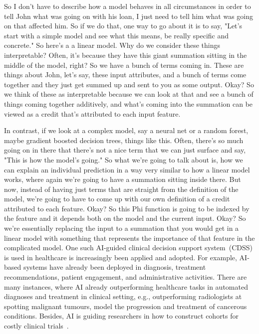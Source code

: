 \hspace*{3.5mm} So I don't have to describe how a model behaves in all circumstances in order to tell John what was going on with his loan, I just need to tell him what was going on that affected him. So if we do that, one way to go about it is to say, "Let's start with a simple model and see what this means, be really specific and concrete." So here's a a linear model. Why do we consider these things interpretable? Often, it's because they have this giant summation sitting in the middle of the model, right? So we have a bunch of terms coming in. These are things about John, let's say, these input attributes, and a bunch of terms come together and they just get summed up and sent to you as some output. Okay? So we think of these as interpretable because we can look at that and see a bunch of things coming together additively, and what's coming into the summation can be viewed as a credit that's attributed to each input feature. 

\hspace*{3.5mm} In contrast, if we look at a complex model, say a neural net or a random forest, maybe gradient boosted decision trees, things like this. Often, there's so much going on in there that there's not a nice term that we can just surface and say, "This is how the model's going." So what we're going to talk about is, how we can explain an individual prediction in a way very similar to how a linear model works, where again we're going to have a summation sitting inside there. But now, instead of having just terms that are straight from the definition of the model, we're going to have to come up with our own definition of a credit attributed to each feature. Okay? So this Phi function is going to be indexed by the feature and it depends both on the model and the current input. Okay? So we're essentially replacing the input to a summation that you would get in a linear model with something that represents the importance of that feature in the complicated model. One such AI-guided clinical decision support system~(CDSS) is used in healthcare is increasingly been applied and adopted. For example, AI-based systems have already been deployed in diagnosis, treatment recommendations, patient engagement, and administrative activities. There are many instances, where AI already outperforming healthcare tasks in automated diagnoses and treatment in clinical setting, e.g., outperforming radiologists at spotting malignant tumours, model the progression and treatment of cancerous conditions. Besides, AI is guiding researchers in how to construct cohorts for costly clinical trials~\cite{davenport2019potential}. 

